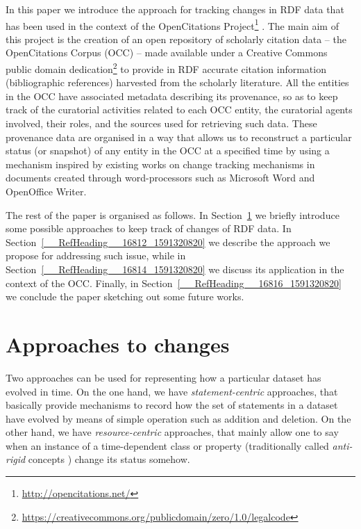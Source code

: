 \documentclass[runningheads,a4paper]{llncs}
\begin{document}
In this paper we introduce the approach for tracking changes in RDF data that has been used in the context of the OpenCitations Project\footnote{\url{http://opencitations.net/}} \cite{__RefNumPara__293_1852566440} \cite{__RefNumPara__17351_1591320820}. The main aim of this project is the creation of an open repository of scholarly citation data -- the OpenCitations Corpus (OCC) -- made available under a Creative Commons public domain dedication\footnote{\url{https://creativecommons.org/publicdomain/zero/1.0/legalcode}} to provide in RDF accurate citation information (bibliographic references) harvested from the scholarly literature. All the entities in the OCC have associated metadata describing its provenance, so as to keep track of the curatorial activities related to each OCC entity, the curatorial agents involved, their roles, and the sources used for retrieving such data. These provenance data are organised in a way that allows us to reconstruct a particular status (or snapshot) of any entity in the OCC at a specified time by using a mechanism inspired by existing works on change tracking mechanisms in documents created through word-processors such as Microsoft Word and OpenOffice Writer.

The rest of the paper is organised as follows. In Section~\ref{__RefHeading__16806_1591320820} we briefly introduce some possible approaches to keep track of changes of RDF data. In Section~\ref{__RefHeading__16812_1591320820} we describe the approach we propose for addressing such issue, while in Section~\ref{__RefHeading__16814_1591320820} we discuss its application in the context of the OCC. Finally, in Section~\ref{__RefHeading__16816_1591320820} we conclude the paper sketching out some future works.

\section{Approaches to changes}\label{__RefHeading__16806_1591320820}

Two approaches can be used for representing how a particular dataset has evolved in time. On the one hand, we have {\em statement-centric} approaches, that basically provide mechanisms to record how the set of statements in a dataset have evolved by means of simple operation such as addition and deletion. On the other hand, we have {\em resource-centric} approaches, that mainly allow one to say when an instance of a time-dependent class or property (traditionally called {\em anti-rigid} concepts  \cite{__RefNumPara__21031_1591320820}) change its status somehow.
\end{document}
